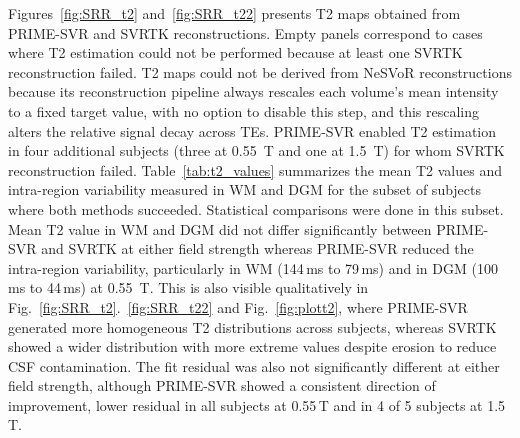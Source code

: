 \documentclass[preprint,authoryear,12pt]{elsarticle}
\begin{document}
Figures~\ref{fig:SRR_t2} and~\ref{fig:SRR_t22} presents T2 maps obtained from PRIME-SVR and SVRTK reconstructions. Empty panels correspond to cases where T2 estimation could not be performed because at least one SVRTK reconstruction failed. 
T2 maps could not be derived from NeSVoR reconstructions because its reconstruction pipeline always rescales each volume's mean intensity to a fixed target value, with no option to disable this step, and this rescaling alters the relative signal decay across TEs.
PRIME-SVR enabled T2 estimation in four additional subjects (three at 0.55~T and one at 1.5~T) for whom SVRTK reconstruction failed. Table~\ref{tab:t2_values} summarizes the mean T2 values and intra-region variability measured in WM and DGM for the subset of subjects where both methods succeeded. Statistical comparisons were done in this subset. Mean T2 value in WM and DGM did not differ significantly between PRIME-SVR and SVRTK at either field strength whereas PRIME-SVR reduced the intra-region variability, particularly in WM (144\,ms to 79\,ms) and in DGM (100\,ms to 44\,ms) at 0.55~T. This is also visible qualitatively in Fig.~\ref{fig:SRR_t2}.~\ref{fig:SRR_t22} and Fig.~\ref{fig:plott2}, where PRIME-SVR generated more homogeneous T2 distributions across subjects, whereas SVRTK showed a wider distribution with more extreme values despite erosion to reduce CSF contamination. The fit residual was also not significantly different at either field strength, although PRIME-SVR showed a consistent direction of improvement, lower residual in all subjects at 0.55\,T and in 4 of 5 subjects at 1.5\,T. 
\end{document}
